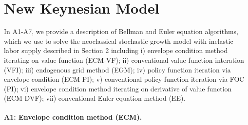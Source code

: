 
\section{New Keynesian Model} \label{app:NKModel}

In A1-A7, we provide a description of Bellman and Euler equation algorithms, which we use to solve
the neoclassical stochastic growth model with inelastic labor supply described in Section 2
including i) envelope condition method iterating on value function (ECM-VF); ii) conventional value
function interation (VFI); iii) endogenous grid method (EGM); iv) policy function iteration via
envelope condition (ECM-PI); v) conventional policy function iteration via FOC (PI); vi) envelope
condition method iterating on derivative of value function (ECM-DVF); vii) conventional Euler
equation method (EE).

\paragraph{A1: Envelope condition method (ECM).}

\qquad

\qquad

